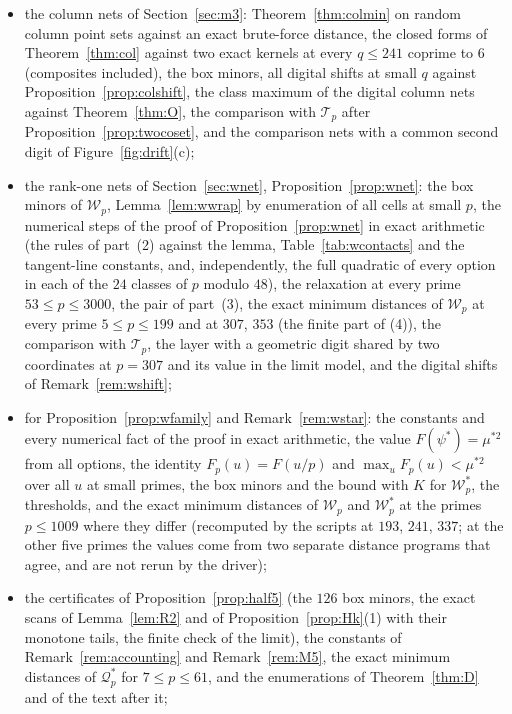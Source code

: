 \documentclass[11pt]{amsart}
\theoremstyle{definition}
\theoremstyle{plain}
\begin{document}
\begin{itemize}
\item the column nets of Section~\ref{sec:m3}: Theorem~\ref{thm:colmin} on random column point sets against an exact brute-force distance, the closed forms of Theorem~\ref{thm:col} against two exact kernels at every $q\le241$ coprime to $6$ (composites included), the box minors, all digital shifts at small $q$ against Proposition~\ref{prop:colshift}, the class maximum of the digital column nets against Theorem~\ref{thm:O}, the comparison with $\mathcal T_p$ after Proposition~\ref{prop:twocoset}, and the comparison nets with a common second digit of Figure~\ref{fig:drift}(c);
\item the rank-one nets of Section~\ref{sec:wnet}, Proposition~\ref{prop:wnet}: the box minors of $\mathcal W_p$, Lemma~\ref{lem:wwrap} by enumeration of all cells at small $p$, the numerical steps of the proof of Proposition~\ref{prop:wnet} in exact arithmetic (the rules of part~(2) against the lemma, Table~\ref{tab:wcontacts} and the tangent-line constants, and, independently, the full quadratic of every option in each of the $24$ classes of $p$ modulo $48$), the relaxation at every prime $53\le p\le3000$, the pair of part~(3), the exact minimum distances of $\mathcal W_p$ at every prime $5\le p\le199$ and at $307$, $353$ (the finite part of (4)), the comparison with $\mathcal T_p$, the layer with a geometric digit shared by two coordinates at $p=307$ and its value in the limit model, and the digital shifts of Remark~\ref{rem:wshift};
\item for Proposition~\ref{prop:wfamily} and Remark~\ref{rem:wstar}: the constants and every numerical fact of the proof in exact arithmetic, the value $F(\psi^*)=\mu^{*2}$ from all options, the identity $F_p(u)=F(u/p)$ and $\max_uF_p(u)<\mu^{*2}$ over all $u$ at small primes, the box minors and the bound with $K$ for $\mathcal W^*_p$, the thresholds, and the exact minimum distances of $\mathcal W_p$ and $\mathcal W^*_p$ at the primes $p\le1009$ where they differ (recomputed by the scripts at $193$, $241$, $337$; at the other five primes the values come from two separate distance programs that agree, and are not rerun by the driver);
\item the certificates of Proposition~\ref{prop:half5} (the $126$ box minors, the exact scans of Lemma~\ref{lem:R2} and of Proposition~\ref{prop:Hk}(1) with their monotone tails, the finite check of the limit), the constants of Remark~\ref{rem:accounting} and Remark~\ref{rem:M5}, the exact minimum distances of $\mathcal Q^*_p$ for $7\le p\le61$, and the enumerations of Theorem~\ref{thm:D} and of the text after it;

\end{itemize}
\end{document}
